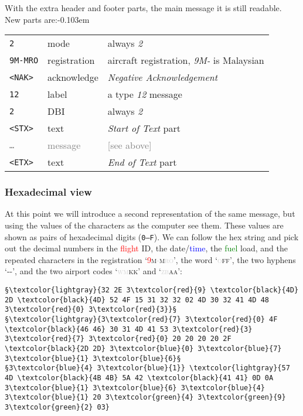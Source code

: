 \documentclass[tikz,a4paper,12pt]{article}
\begin{document}
{With the extra header and footer parts, the main message it is still readable. New parts are:\unskip\parfillskip-0.103em \par}

\begin{center}
\begin{tabular}{p{1.5cm}p{2cm}p{8cm}}
\hfill\texttt{2}&mode&always \emph{2}\\
\hfill\texttt{9M-MRO}&registration&aircraft registration, \emph{9M-} is Malaysian\\
\hfill\texttt{<NAK>}&acknowledge&\emph{Negative Acknowledgement}\\
\hfill\texttt{12}&label&a type \emph{12} message\\
\hfill\texttt{2}&DBI&always \emph{2}\\
\hfill\texttt{<STX>}&text&\emph{Start of Text} part\\
\hline
\hfill\textcolor{gray}{\texttt{\ldots}}&\textcolor{gray}{message}&\textcolor{gray}{[see above]}\\
\hline
\hfill\texttt{<ETX>}&text&\emph{End of Text} part\\
\end{tabular}
\end{center}

\subsubsection*{Hexadecimal view}
At this point we will introduce a second representation of the same
message, but using the values of the characters as the computer see
them.  These values are shown as pairs of hexadecimal digits (\texttt{0--F}).  We can follow the hex string and pick out the decimal numbers in the
\textcolor{red}{flight} ID, the date/\textcolor{blue}{time}, the
\textcolor{green}{fuel} load, and the repeated characters in the
registration
\textsc{`\textcolor{red}{9}m\textcolor{lightgray}{-}m\textcolor{lightgray}{ro}'},
the word \textsc{`\textcolor{lightgray}{o}ff'}, the two hyphens `-{}-', and
the two airport codes \textsc{`\textcolor{lightgray}{wm}kk'} and
\textsc{`\textcolor{lightgray}{zb}aa'}:

\begin{lstlisting}[language=ACARS]
         §\textcolor{lightgray}{32 2E 3\textcolor{red}{9} \textcolor{black}{4D} 2D \textcolor{black}{4D} 52 4F 15 31 32 32 02 4D 30 32 41 4D 48 3\textcolor{red}{0} 3\textcolor{red}{3}}§
§\textcolor{lightgray}{3\textcolor{red}{7} 3\textcolor{red}{0} 4F \textcolor{black}{46 46} 30 31 4D 41 53 3\textcolor{red}{3} 3\textcolor{red}{7} 3\textcolor{red}{0} 20 20 20 20 2F \textcolor{black}{2D 2D} 3\textcolor{blue}{0} 3\textcolor{blue}{7} 3\textcolor{blue}{1} 3\textcolor{blue}{6}§
§3\textcolor{blue}{4} 3\textcolor{blue}{1}} \textcolor{lightgray}{57 4D \textcolor{black}{4B 4B} 5A 42 \textcolor{black}{41 41} 0D 0A 3\textcolor{blue}{1} 3\textcolor{blue}{6} 3\textcolor{blue}{4} 3\textcolor{blue}{1} 20 3\textcolor{green}{4} 3\textcolor{green}{9} 3\textcolor{green}{2} 03}
\end{lstlisting}
\end{document}
